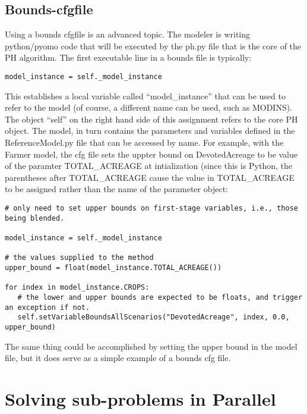 \subsection{Bounds-cfgfile}

Using a bounds cfgfile is an advanced topic. The modeler is writing python/pyomo code that will be executed by the 
ph.py file that is the core of the PH algorithm. The first executable line in a bounds file is typically:

\begin{verbatim}
model_instance = self._model_instance
\end{verbatim}

This establishes a local variable called ``model\_instance'' that can be used to refer to the model (of course, a different name can be
used, such as MODINS). The object ``self'' on the right hand side of this assignment refers to the core PH object. The model, in turn contains the parameters and 
variables defined in the ReferenceModel.py file that can be accessed by name. For example, with the Farmer model, the cfg file
sets the uppter bound on DevotedAcreage to be value of the paramter TOTAL\_ACREAGE at intialization (since this is Python, the
parentheses after TOTAL\_ACREAGE cause the value in TOTAL\_ACREAGE to be assigned rather than the name of the parameter object:

\begin{verbatim}
# only need to set upper bounds on first-stage variables, i.e., those being blended.

model_instance = self._model_instance

# the values supplied to the method 
upper_bound = float(model_instance.TOTAL_ACREAGE())

for index in model_instance.CROPS:
   # the lower and upper bounds are expected to be floats, and trigger an exception if not.
   self.setVariableBoundsAllScenarios("DevotedAcreage", index, 0.0, upper_bound)
\end{verbatim}

The same thing could be accomplished by setting the upper bound in the model file, but it does serve as a simple example of a bounds cfg file.



\section{Solving sub-problems in Parallel \label{parallelsec}}

